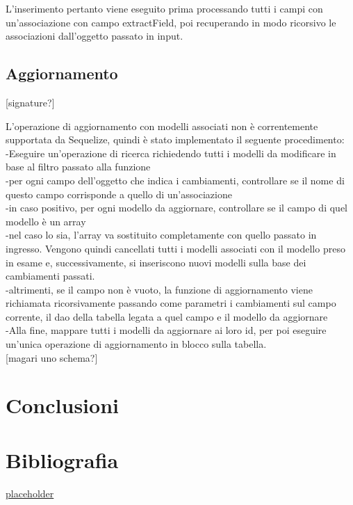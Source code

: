 \documentclass[a4paper, 12pt]{scrartcl}
\begin{document}
          L'inserimento pertanto viene eseguito prima processando tutti i campi con un'associazione con campo extractField, poi recuperando in modo ricorsivo le associazioni dall'oggetto passato in input.

      \subsection*{Aggiornamento}
          [signature?]

          L'operazione di aggiornamento con modelli associati non è correntemente supportata da Sequelize, quindi è stato implementato il seguente procedimento:\\
              -Eseguire un'operazione di ricerca richiedendo tutti i modelli da modificare in base al filtro passato alla funzione\\
              -per ogni campo dell'oggetto che indica i cambiamenti, controllare se il nome di questo campo corrisponde a quello di un'associazione\\
              -in caso positivo, per ogni modello da aggiornare, controllare se il campo di quel modello è un array\\
                  -nel caso lo sia, l'array va sostituito completamente con quello passato in ingresso. Vengono quindi cancellati tutti i modelli associati con il modello preso in esame e,
                  successivamente, si inseriscono nuovi modelli sulla base dei cambiamenti passati.\\
                  -altrimenti, se il campo non è vuoto, la funzione di aggiornamento viene richiamata ricorsivamente passando come parametri i cambiamenti sul campo corrente, il dao della tabella legata a quel campo e il modello da aggiornare\\
              -Alla fine, mappare tutti i modelli da aggiornare ai loro id, per poi eseguire un'unica operazione di aggiornamento in blocco sulla tabella.\\
          
          [magari uno schema?]


  \section*{Conclusioni}

  \section*{Bibliografia}
          \href{https://hostname.com}{placeholder} \\
\end{document}
